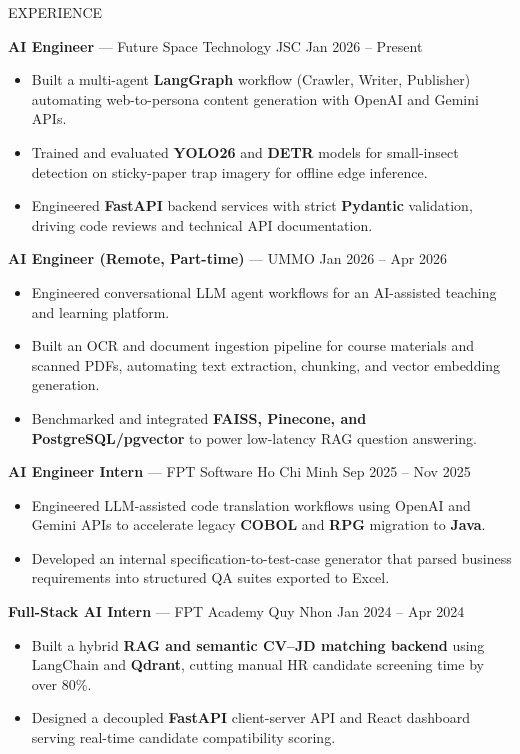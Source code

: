 \documentclass[10pt]{resume}
\begin{document}
\begin{rSection}{EXPERIENCE}

\textbf{AI Engineer} --- Future Space Technology JSC \hfill Jan 2026 -- Present
\begin{itemize}
    \item Built a multi-agent \textbf{LangGraph} workflow (Crawler, Writer, Publisher) automating web-to-persona content generation with OpenAI and Gemini APIs.
    \item Trained and evaluated \textbf{YOLO26} and \textbf{DETR} models for small-insect detection on sticky-paper trap imagery for offline edge inference.
    \item Engineered \textbf{FastAPI} backend services with strict \textbf{Pydantic} validation, driving code reviews and technical API documentation.
\end{itemize}

\textbf{AI Engineer (Remote, Part-time)} --- UMMO \hfill Jan 2026 -- Apr 2026
\begin{itemize}
    \item Engineered conversational LLM agent workflows for an AI-assisted teaching and learning platform.
    \item Built an OCR and document ingestion pipeline for course materials and scanned PDFs, automating text extraction, chunking, and vector embedding generation.
    \item Benchmarked and integrated \textbf{FAISS, Pinecone, and PostgreSQL/pgvector} to power low-latency RAG question answering.
\end{itemize}

\textbf{AI Engineer Intern} --- FPT Software Ho Chi Minh \hfill Sep 2025 -- Nov 2025
\begin{itemize}
    \item Engineered LLM-assisted code translation workflows using OpenAI and Gemini APIs to accelerate legacy \textbf{COBOL} and \textbf{RPG} migration to \textbf{Java}.
    \item Developed an internal specification-to-test-case generator that parsed business requirements into structured QA suites exported to Excel.
\end{itemize}

\textbf{Full-Stack AI Intern} --- FPT Academy Quy Nhon \hfill Jan 2024 -- Apr 2024
\begin{itemize}
    \item Built a hybrid \textbf{RAG and semantic CV--JD matching backend} using LangChain and \textbf{Qdrant}, cutting manual HR candidate screening time by over 80\%.
    \item Designed a decoupled \textbf{FastAPI} client-server API and React dashboard serving real-time candidate compatibility scoring.
\end{itemize}

\end{rSection}
\end{document}
